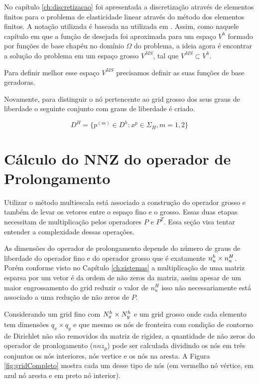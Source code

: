 No capítulo \ref{ch:discretizacao} foi apresentada a discretização através de elementos finitos para o problema de elasticidade linear através do método dos elementos finitos. A notação utilizada é baseada na utilizada em \cite{mbuck}. Assim, como naquele capítulo em que a função de desejada foi aproximada para um espaço $V^h$ formado por funções de base chapéu no domínio $\Omega$ do problema, a ideia agora é encontrar a solução do problema em um espaço grosso $V^{MS}$, tal que $V^{MS} \subset V^h$. 



Para definir melhor esse espaço $V^{MS}$ precisamos definir as suas funções de base geradoras. 


Novamente, para distinguir o nó pertencente ao grid grosso dos seus graus de liberdade o seguinte conjunto com graus de liberdade é criado.


\begin{equation}
    D^H = \{ p^{(m)} \in D^h : x^p \in \Sigma_H, m=1,2\}
\end{equation}



\section{Cálculo do NNZ do operador de Prolongamento}\label{sec:complexProlong}

Utilizar o método multiescala está associado a construção do operador grosso e também de levar os vetores entre o espaço fino e o grosso. Essas duas etapas necessitam de multiplicação pelos operadores $P$ e $P^T$. Essa seção visa tentar entender a complexidade dessas operações.

As dimensões do operador de prolongamento depende do número de graus de liberdade do operador fino e do operador grosso que é exatamente $n_u^h \times n_u^H$. Porém conforme visto no Capítulo \ref{ch:sistemas} a multiplicação de uma matriz esparsa por um vetor é da ordem de não zeros da matriz, assim apesar de um maior engrossamento do grid reduzir o valor de $n_u^H$ isso não necessariamente está associado a uma redução de não zeros de $P$.

Considerando um grid fino com $N^h_x \times N^h_y$ e um grid grosso onde cada elemento tem dimensões $q_x \times q_y$ e que mesmo os nós de fronteira com condição de contorno de Dirichlet não são removidos da matriz de rigidez, a quantidade de não zeros do operador de pronlogamento ($nnz_p$) pode ser calculada dividindo os nós em três conjuntos os nós interiores, nós vertice e os nós na aresta.  A Figura \ref{fig:gridCompleto} mostra cada um desse tipo de nós (em vermelho nó vértice, em azul nó aresta e em preto nó interior).


